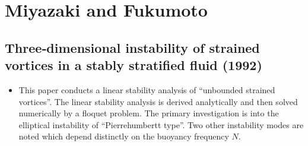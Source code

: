 \documentclass{article}
\begin{document}
\section{Miyazaki and Fukumoto}
    \subsection{Three‐dimensional instability of strained vortices in a stably
    stratified fluid (1992)}
    \begin{itemize}
        \item This paper conducts a linear stability analysis of ``unbounded
        strained vortices''. The linear stability analysis is derived analytically
        and then solved numerically by a floquet problem. The primary investigation
        is into the elliptical instability of ``Pierrehumbertt type''. Two other
        instability modes are noted which depend distinctly on the buoyancy
        frequency $N$.
    \end{itemize}
\end{document}
